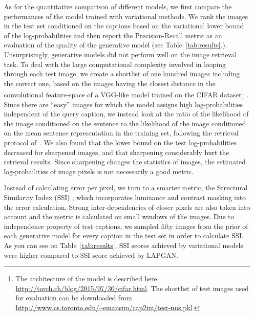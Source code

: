 \documentclass{article} %
\begin{document}
As for the quantitative comparison of different models, we first compare the performances of the model trained with variational methods. We rank the images in the test set conditioned on the captions based on the variational lower bound of the log-probabilities 
and then report the Precision-Recall metric as an evaluation of the quality of the generative model (see Table~\ref{tab:results}.). Unsurprisingly, generative models did not perform well on the image retrieval task. To deal with the large computational complexity involved in looping through each test image, we create a shortlist of one hundred images including the correct one, based on the images having the closest distance in the convolutional feature-space of a VGG-like model \citep{simonyan_convnet} trained on the CIFAR dataset\footnote{The architecture of the model is described here \url{http://torch.ch/blog/2015/07/30/cifar.html}. The shortlist of test images used for evaluation can be downloaded from \url{http://www.cs.toronto.edu/~emansim/cap2im/test-nns.pkl}.} \citep{krizhevsky_cifar}. 
Since there are ``easy'' images for which the model assigns high log-probabilities independent of the query caption, 
we instead look at the ratio of 
the likelihood of the image conditioned on the sentence to the likelihood of the image conditioned on the mean sentence representation in the training set, following the retrieval protocol of~\citep{kiros_captions}.
We also found that the lower bound on the test log-probabilities decreased for sharpened images, and that sharpening considerably hurt the retrieval results. Since sharpening changes the statistics of images, the estimated log-probailities of image pixels is not necessarily a good metric.

Instead of calculating error per pixel, we turn to a smarter metric, the Structural Similarity Index (SSI) \citep{wang_ssi}, which incorporates luminance and contrast masking into the error calculation. Strong inter-dependencies of closer pixels are also taken into account and the metric is calculated on small windows of the images. Due to independence property of test captions, we sampled fifty images from the prior of each generative model for every caption in the test set in order to calculate SSI. As you can see on Table~\ref{tab:results}, SSI scores achieved by variational models were higher compared to SSI score achieved by LAPGAN.
\end{document}
